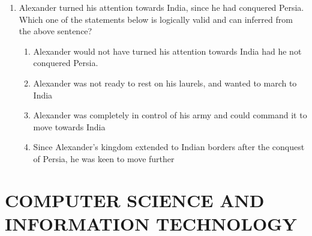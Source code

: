 \documentclass[journal,12pt,onecolumn]{IEEEtran}
\theoremstyle{remark}
\begin{document}
\begin{enumerate}
		\hfill{}
		
		\begin{enumerate}
		\end{enumerate}
		
		\item Alexander turned his attention towards India, since he had conquered Persia. Which one of the statements below is logically valid and can inferred from the above sentence?
		
		\hfill{\brak{\text{GATE CS 2015}}}
		
		\begin{enumerate}
			\item Alexander would not have turned his attention towards India had he not conquered Persia.
			\item Alexander was not ready to rest on his laurels, and wanted to march to India
			\item Alexander was completely in control of his army and could command it to move towards India
			\item Since Alexander's kingdom extended to Indian borders after the conquest of Persia, he was keen to move further
		\end{enumerate}
		
	\end{enumerate}
	\newpage
	\section*{\Large COMPUTER SCIENCE AND INFORMATION TECHNOLOGY}
	\vspace{0.7cm}
	
\end{document}
